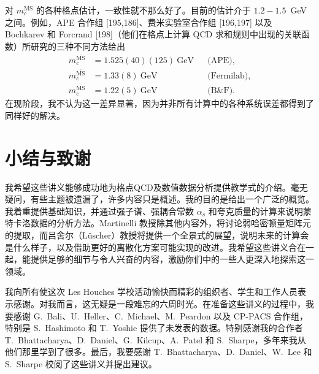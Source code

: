 对 $m_c^{\overline{\mathrm{MS}}}$ 的各种格点估计，一致性就不那么好了。目前的估计介于 $1.2 - 1.5$~GeV 之间。例如，APE 合作组 [195,186]、费米实验室合作组 [196,197] 以及 Bochkarev 和 Forcrand [198]（他们在格点上计算 QCD 求和规则中出现的关联函数）所研究的三种不同方法给出
\begin{equation}
\begin{aligned}
m_c^{\overline{\mathrm{MS}}} &= 1.525(40)(125)~\mathrm{GeV} && \text{(APE)}, \\
m_c^{\overline{\mathrm{MS}}} &= 1.33(8)~\mathrm{GeV} && \text{(Fermilab)}, \\
m_c^{\overline{\mathrm{MS}}} &= 1.22(5)~\mathrm{GeV} && \text{(B\&F)}.
\end{aligned}
\end{equation}
在现阶段，我不认为这一差异显著，因为并非所有计算中的各种系统误差都得到了同样好的解决。

\section*{小结与致谢}

我希望这些讲义能够成功地为格点QCD及数值数据分析提供教学式的介绍。毫无疑问，有些主题被遗漏了，许多内容只是概述。我的目的是给出一个广泛的概览。我着重提供基础知识，并通过强子谱、强耦合常数 $\alpha_s$ 和夸克质量的计算来说明蒙特卡洛数据的分析方法。Martinelli 教授除其他内容外，将讨论弱哈密顿量矩阵元的提取，而吕舍尔（Lüscher）教授将提供一个全景式的展望，说明未来的计算会是什么样子，以及借助更好的离散化方案可能实现的改进。我希望这些讲义合在一起，能提供足够的细节与令人兴奋的内容，激励你们中的一些人更深入地探索这一领域。

我向所有使这次 Les Houches 学校活动愉快而精彩的组织者、学生和工作人员表示感谢。对我而言，这无疑是一段难忘的六周时光。在准备这些讲义的过程中，我要感谢 G.~Bali、U.~Heller、C.~Michael、M.~Peardon 以及 CP-PACS 合作组，特别是 S.~Hashimoto 和 T.~Yoshie 提供了未发表的数据。特别感谢我的合作者 T.~Bhattacharya、D.~Daniel、G.~Kilcup、A.~Patel 和 S.~Sharpe，多年来我从他们那里学到了很多。最后，我要感谢 T.~Bhattacharya、D.~Daniel、W.~Lee 和 S.~Sharpe 校阅了这些讲义并提出建议。
